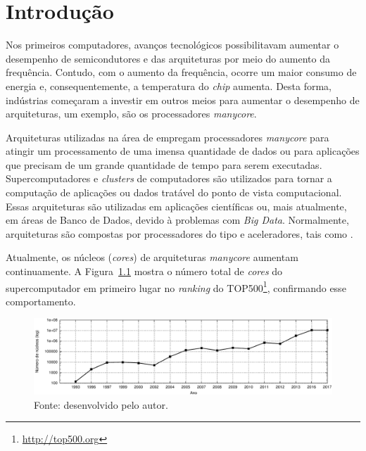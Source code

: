 \chapter{Introdução}


Nos primeiros computadores, avanços tecnológicos possibilitavam aumentar o
desempenho de semicondutores e das arquiteturas por meio do aumento da
frequência. Contudo, com o aumento da frequência, ocorre um maior consumo de
energia e, consequentemente, a temperatura do \textit{chip} aumenta. Desta
forma, indústrias começaram a investir em outros meios para aumentar o
desempenho de arquiteturas, um exemplo, são os processadores \textit{manycore}.

Arquiteturas utilizadas na área de \hpc empregam processadores \textit{manycore} para atingir um
processamento de uma imensa quantidade de dados ou para aplicações que precisam
de um grande quantidade de tempo para serem executadas. Supercomputadores e
\textit{clusters} de computadores são utilizados para tornar a computação de
aplicações ou dados tratável do ponto de vista computacional. Essas arquiteturas
são utilizadas em aplicações científicas ou, mais atualmente, em áreas de Banco
de Dados, devido à problemas com \textit{Big Data}. Normalmente, arquiteturas
\hpc são compostas por processadores do tipo \cpu{} e aceleradores, tais como \gpu.

Atualmente, os núcleos (\textit{cores}) de arquiteturas \textit{manycore}
aumentam continuamente. A Figura~\ref{fig:graphCores} mostra o número total de
\textit{cores} do supercomputador em primeiro lugar no \textit{ranking} do
TOP500\footnote{\url{http://top500.org}}, confirmando esse comportamento.


\begin{figure}[b]
	\centering
	\caption{Crescimento do número de núcleos do supercomputadores número 1 do \textit{ranking} Top500 (dados extraídos do Top500).}
	\includegraphics[width=\textwidth]{figs/top500.pdf}
    \caption*{Fonte: desenvolvido pelo autor.}
	\label{fig:graphCores}
\end{figure}

